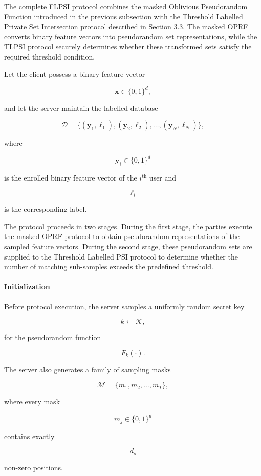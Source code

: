 \documentclass[11pt,a4paper]{article}
\begin{document}
The complete FLPSI protocol combines the masked Oblivious Pseudorandom Function introduced in the previous subsection with the Threshold Labelled Private Set Intersection protocol described in Section 3.3. The masked OPRF converts binary feature vectors into pseudorandom set representations, while the TLPSI protocol securely determines whether these transformed sets satisfy the required threshold condition.

Let the client possess a binary feature vector

\[
\mathbf{x}\in\{0,1\}^{d},
\]

and let the server maintain the labelled database

\[
\mathcal{D}
=
\{
(\mathbf{y}_1,\ell_1),
(\mathbf{y}_2,\ell_2),
\ldots,
(\mathbf{y}_N,\ell_N)
\},
\]

where

\[
\mathbf{y}_i\in\{0,1\}^{d}
\]

is the enrolled binary feature vector of the \(i^{\text{th}}\) user and

\[
\ell_i
\]

is the corresponding label.

The protocol proceeds in two stages. During the first stage, the parties execute the masked OPRF protocol to obtain pseudorandom representations of the sampled feature vectors. During the second stage, these pseudorandom sets are supplied to the Threshold Labelled PSI protocol to determine whether the number of matching sub-samples exceeds the predefined threshold.

\paragraph{Initialization}

Before protocol execution, the server samples a uniformly random secret key

\[
k
\leftarrow
\mathcal{K},
\]

for the pseudorandom function

\[
F_k(\cdot).
\]

The server also generates a family of sampling masks

\[
\mathcal{M}
=
\{
m_1,m_2,\ldots,m_T
\},
\]

where every mask

\[
m_j
\in
\{0,1\}^{d}
\]

contains exactly

\[
d_s
\]

non-zero positions.
\end{document}
